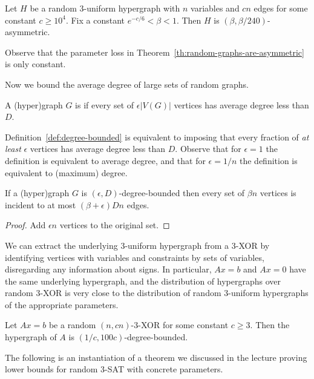 \documentclass[a4paper,twoside,justified]{tufte-handout}
\begin{document}
\begin{theorem}
  \label{th:random-graphs-are-asymmetric}
  Let $H$ be a random $3$-uniform hypergraph with $n$ variables and $cn$ edges for some constant $c \geq 10^4$. Fix a constant $e^{-c/6} < \beta < 1$. Then \whp $H$ is $(\beta,\beta/240)$-asymmetric.
\end{theorem}

Observe that the parameter loss in Theorem~\ref{th:random-graphs-are-asymmetric} is only constant.

Now we bound the average degree of large sets of random graphs.

\begin{definition}
  \label{def:degree-bounded}
  A (hyper)graph $G$ is  if every set of $\epsilon|V(G)|$ vertices has average degree less than $D$.
\end{definition}

Definition~\ref{def:degree-bounded} is equivalent to imposing that every fraction of \emph{at least} $\epsilon$ vertices has average degree less than $D$. Observe that for $\epsilon=1$ the definition is equivalent to average degree, and that for $\epsilon = 1/n$ the definition is equivalent to (maximum) degree.

\begin{lemma}
  \label{lem:degree-bounded-few-edges}
  If a (hyper)graph $G$ is $(\epsilon,D)$-degree-bounded then every set of $\beta n$ vertices is incident to at most $(\beta + \epsilon)Dn$ edges.
\end{lemma}
\begin{proof}
  Add $\epsilon n$ vertices to the original set.
\end{proof}

We can extract the underlying 3-uniform hypergraph from a 3-XOR by identifying vertices with variables and constraints by sets of variables, disregarding any information about signs. In particular, $Ax=b$ and $Ax=0$ have the same underlying hypergraph, and the distribution of hypergraphs over random 3-XOR is very close to the distribution of random 3-uniform hypergraphs of the appropriate parameters.

\begin{lemma}
  \label{lem:random-graphs-are-degree-bounded}
  Let $Ax=b$ be a random $(n,cn)$-3-XOR for some constant $c \geq 3$. Then \whp the hypergraph of $A$ is $(1/c,100c)$-degree-bounded.
\end{lemma}

The following is an instantiation of a theorem we discussed in the lecture proving lower bounds for random 3-SAT with concrete parameters.
\end{document}
